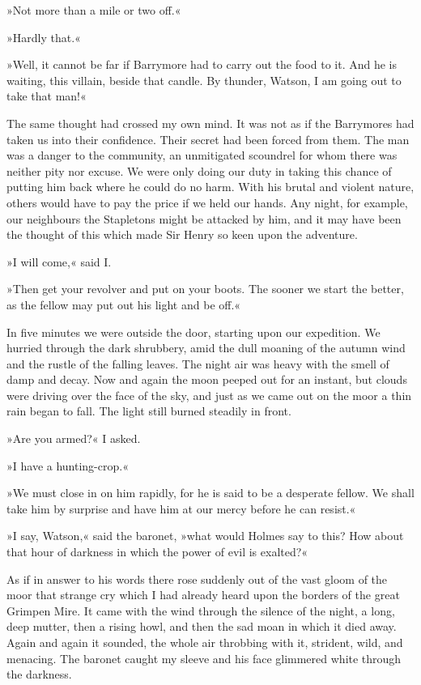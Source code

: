 »Not more than a mile or two off.«

»Hardly that.«

»Well, it cannot be far if Barrymore had to carry out the food to it. And he is waiting, this villain, beside that candle. By thunder, Watson, I am going out to take that man!«

The same thought had crossed my own mind. It was not as if the Barrymores had taken us into their confidence. Their secret had been forced from them. The man was a danger to the community, an unmitigated scoundrel for whom there was neither pity nor excuse. We were only doing our duty in taking this chance of putting him back where he could do no harm. With his brutal and violent nature, others would have to pay the price if we held our hands. Any night, for example, our neighbours the Stapletons might be attacked by him, and it may have been the thought of this which made Sir Henry so keen upon the adventure.

»I will come,« said I.

»Then get your revolver and put on your boots. The sooner we start the better, as the fellow may put out his light and be off.«

In five minutes we were outside the door, starting upon our expedition. We hurried through the dark shrubbery, amid the dull moaning of the autumn wind and the rustle of the falling leaves. The night air was heavy with the smell of damp and decay. Now and again the moon peeped out for an instant, but clouds were driving over the face of the sky, and just as we came out on the moor a thin rain began to fall. The light still burned steadily in front.

»Are you armed?« I asked.

»I have a hunting-crop.«

»We must close in on him rapidly, for he is said to be a desperate fellow. We shall take him by surprise and have him at our mercy before he can resist.«

»I say, Watson,« said the baronet, »what would Holmes say to this? How about that hour of darkness in which the power of evil is exalted?«

As if in answer to his words there rose suddenly out of the vast gloom of the moor that strange cry which I had already heard upon the borders of the great Grimpen Mire. It came with the wind through the silence of the night, a long, deep mutter, then a rising howl, and then the sad moan in which it died away. Again and again it sounded, the whole air throbbing with it, strident, wild, and menacing. The baronet caught my sleeve and his face glimmered white through the darkness.




